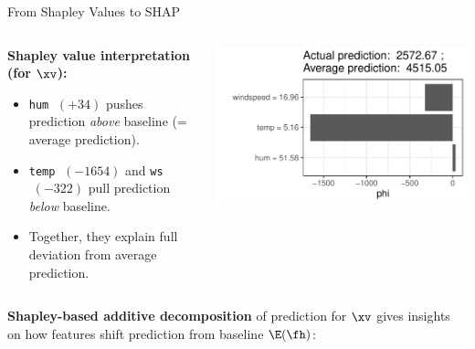 \documentclass[11pt,compress,t,notes=noshow, aspectratio=169, xcolor=table]{beamer}
\begin{document}
\begin{frame}{From Shapley Values to SHAP}


\begin{columns}[T, onlytextwidth]
\begin{column}{0.51\textwidth}




\textbf{Shapley value interpretation (for $\xv$):}
\begin{itemize}
  \item \texttt{hum} \(\;(+34)\) pushes prediction \emph{above} baseline (= average prediction).  
  \item \texttt{temp} \(\;(-1654)\) and \texttt{ws} \(\;(-322)\) pull prediction \emph{below} baseline.
  \item Together, they explain full deviation from average prediction.
\end{itemize}




\end{column}
\begin{column}{0.49\textwidth}
\includegraphics[trim={10 17 5 5},clip, width=\linewidth]{figure/shapley2shap.pdf}
\end{column}
\end{columns}
\pause
\textbf{Shapley-based additive decomposition} of prediction for $\xv$ gives insights on how features shift prediction from baseline $\E(\fh)$:


\end{frame}
\end{document}
